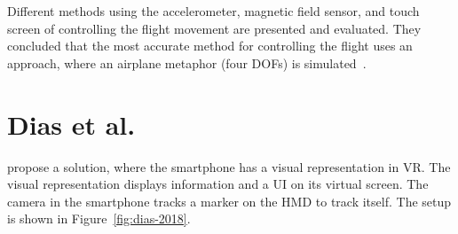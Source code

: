 Different methods using the accelerometer, magnetic field sensor, and touch screen of controlling the flight movement are presented and evaluated. They concluded that the most accurate method for controlling the flight uses an approach, where an airplane metaphor (four \glspl{DOF}) is simulated~\cite{Benzina.2011}.


\section{Dias et al.}\label{section:dias-2018}
\citeauthor{Dias.2018} propose a solution, where the smartphone has a visual representation in \gls{VR}. The visual representation displays information and a \gls{UI} on its virtual screen. The camera in the smartphone tracks a marker on the \gls{HMD} to track itself. The setup is shown in Figure~\ref{fig:dias-2018}.

